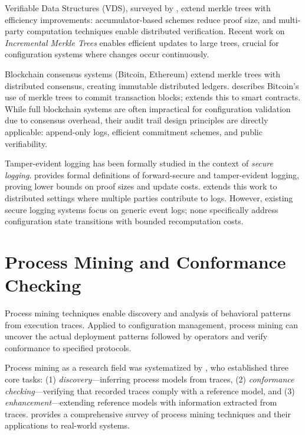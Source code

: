Verifiable Data Structures (VDS), surveyed by \citet{Gupta2020}, extend merkle trees with efficiency improvements: accumulator-based schemes reduce proof size, and multi-party computation techniques enable distributed verification. Recent work on \emph{Incremental Merkle Trees} \citep{Tzialla2021} enables efficient updates to large trees, crucial for configuration systems where changes occur continuously.

Blockchain consensus systems (Bitcoin, Ethereum) extend merkle trees with distributed consensus, creating immutable distributed ledgers. \citet{Nakamoto2008} describes Bitcoin's use of merkle trees to commit transaction blocks; \citet{Buterin2014} extends this to smart contracts. While full blockchain systems are often impractical for configuration validation due to consensus overhead, their audit trail design principles are directly applicable: append-only logs, efficient commitment schemes, and public verifiability.

Tamper-evident logging has been formally studied in the context of \emph{secure logging}. \citet{Bellare2009} provides formal definitions of forward-secure and tamper-evident logging, proving lower bounds on proof sizes and update costs. \citet{Kelsey2011} extends this work to distributed settings where multiple parties contribute to logs. However, existing secure logging systems focus on generic event logs; none specifically address configuration state transitions with bounded recomputation costs.

\section{Process Mining and Conformance Checking}

Process mining techniques enable discovery and analysis of behavioral patterns from execution traces. Applied to configuration management, process mining can uncover the actual deployment patterns followed by operators and verify conformance to specified protocols.

Process mining as a research field was systematized by \citet{VanDerAalst2012}, who established three core tasks: (1) \emph{discovery}—inferring process models from traces, (2) \emph{conformance checking}—verifying that recorded traces comply with a reference model, and (3) \emph{enhancement}—extending reference models with information extracted from traces. \citet{VanDerAalst2016} provides a comprehensive survey of process mining techniques and their applications to real-world systems.

